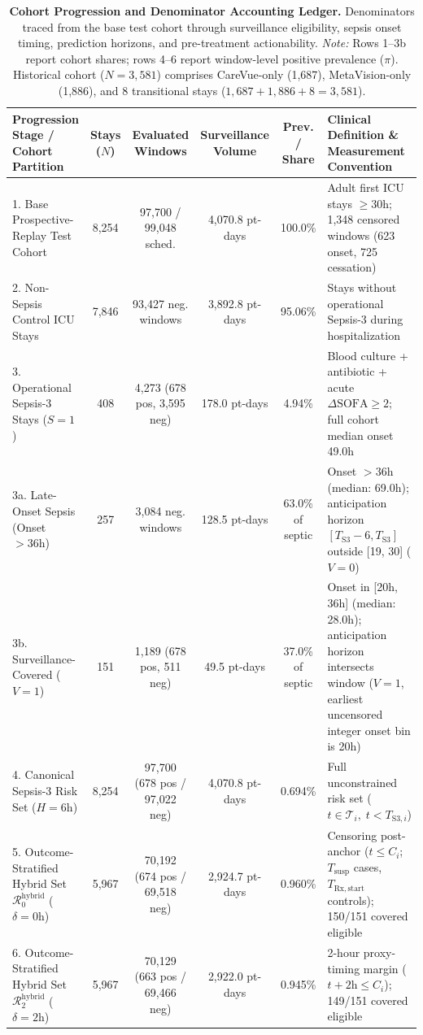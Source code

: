 \documentclass[10pt,twocolumn,a4paper]{article}
\begin{document}
\begin{table}[t]
\centering
\scriptsize
\setlength{\tabcolsep}{4pt}
\caption{\textbf{Cohort Progression and Denominator Accounting Ledger.} Denominators traced from the base test cohort through surveillance eligibility, sepsis onset timing, prediction horizons, and pre-treatment actionability. \textit{Note:} Rows 1--3b report cohort shares; rows 4--6 report window-level positive prevalence ($\pi$). Historical cohort ($N=3,581$) comprises CareVue-only (1,687), MetaVision-only (1,886), and 8 transitional stays ($1,687 + 1,886 + 8 = 3,581$).}
\label{tab:table1}
\begin{tabularx}{\textwidth}{@{}l c c c c X@{}}
\toprule
\textbf{Progression Stage / Cohort Partition} & \textbf{Stays ($N$)} & \textbf{Evaluated Windows} & \textbf{Surveillance Volume} & \textbf{Prev. / Share} & \textbf{Clinical Definition \& Measurement Convention} \\
\midrule
1. Base Prospective-Replay Test Cohort & 8,254 & 97,700 / 99,048 sched. & 4,070.8 pt-days & 100.0\% & Adult first ICU stays $\ge 30\text{h}$; 1,348 censored windows (623 onset, 725 cessation) \\
2. Non-Sepsis Control ICU Stays & 7,846 & 93,427 neg. windows & 3,892.8 pt-days & 95.06\% & Stays without operational Sepsis-3 during hospitalization \\
3. Operational Sepsis-3 Stays ($S=1$) & 408 & 4,273 (678 pos, 3,595 neg) & 178.0 pt-days & 4.94\% & Blood culture + antibiotic + acute $\Delta\text{SOFA}\ge 2$; full cohort median onset 49.0h \\
\quad 3a. Late-Onset Sepsis (Onset $>36\text{h}$) & 257 & 3,084 neg. windows & 128.5 pt-days & 63.0\% of septic & Onset $>36\text{h}$ (median: 69.0h); anticipation horizon $[T_{\text{S3}}-6, T_{\text{S3}}]$ outside [19, 30] ($V=0$) \\
\quad 3b. Surveillance-Covered ($V=1$) & 151 & 1,189 (678 pos, 511 neg) & 49.5 pt-days & 37.0\% of septic & Onset in [20h, 36h] (median: 28.0h); anticipation horizon intersects window ($V=1$, earliest uncensored integer onset bin is 20h) \\
4. Canonical Sepsis-3 Risk Set ($H=6\text{h}$) & 8,254 & 97,700 (678 pos / 97,022 neg) & 4,070.8 pt-days & 0.694\% & Full unconstrained risk set ($t \in \mathcal{T}_i, \; t < T_{\text{S3}, i}$) \\
5. Outcome-Stratified Hybrid Set $\mathcal{R}_0^{\mathrm{hybrid}}$ ($\delta=0\text{h}$) & 5,967 & 70,192 (674 pos / 69,518 neg) & 2,924.7 pt-days & 0.960\% & Censoring post-anchor ($t \le C_i$; $T_{\mathrm{susp}}$ cases, $T_{\mathrm{Rx,start}}$ controls); 150/151 covered eligible \\
6. Outcome-Stratified Hybrid Set $\mathcal{R}_2^{\mathrm{hybrid}}$ ($\delta=2\text{h}$) & 5,967 & 70,129 (663 pos / 69,466 neg) & 2,922.0 pt-days & 0.945\% & 2-hour proxy-timing margin ($t + 2\text{h} \le C_i$); 149/151 covered eligible \\
\bottomrule
\end{tabularx}
\end{table}
\end{document}
